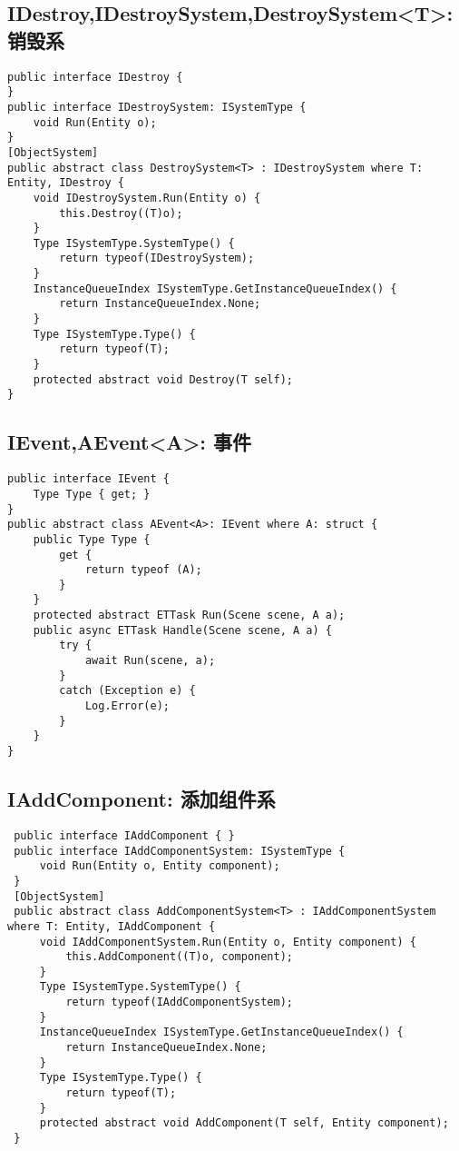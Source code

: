 \documentclass[9pt, b5paper]{article}
\begin{document}
\subsection{IDestroy,IDestroySystem,DestroySystem<T>: 销毁系}
\label{sec-2-12}
\begin{verbatim}
public interface IDestroy {
}
public interface IDestroySystem: ISystemType {
    void Run(Entity o);
}
[ObjectSystem]
public abstract class DestroySystem<T> : IDestroySystem where T: Entity, IDestroy {
    void IDestroySystem.Run(Entity o) {
        this.Destroy((T)o);
    }
    Type ISystemType.SystemType() {
        return typeof(IDestroySystem);
    }
    InstanceQueueIndex ISystemType.GetInstanceQueueIndex() {
        return InstanceQueueIndex.None;
    }
    Type ISystemType.Type() {
        return typeof(T);
    }
    protected abstract void Destroy(T self);
}
\end{verbatim}
\subsection{IEvent,AEvent<A>: 事件}
\label{sec-2-13}
\begin{verbatim}
public interface IEvent {
    Type Type { get; }
}
public abstract class AEvent<A>: IEvent where A: struct {
    public Type Type {
        get {
            return typeof (A);
        }
    }
    protected abstract ETTask Run(Scene scene, A a);
    public async ETTask Handle(Scene scene, A a) {
        try {
            await Run(scene, a);
        }
        catch (Exception e) {
            Log.Error(e);
        }
    }
}
\end{verbatim}
\subsection{IAddComponent: 添加组件系}
\label{sec-2-14}
\begin{verbatim}
 public interface IAddComponent { }
 public interface IAddComponentSystem: ISystemType {
     void Run(Entity o, Entity component);
 }
 [ObjectSystem]
 public abstract class AddComponentSystem<T> : IAddComponentSystem where T: Entity, IAddComponent {
     void IAddComponentSystem.Run(Entity o, Entity component) {
         this.AddComponent((T)o, component);
     }
     Type ISystemType.SystemType() {
         return typeof(IAddComponentSystem);
     }
     InstanceQueueIndex ISystemType.GetInstanceQueueIndex() {
         return InstanceQueueIndex.None;
     }
     Type ISystemType.Type() {
         return typeof(T);
     }
     protected abstract void AddComponent(T self, Entity component);
 }
\end{verbatim}
\end{document}

